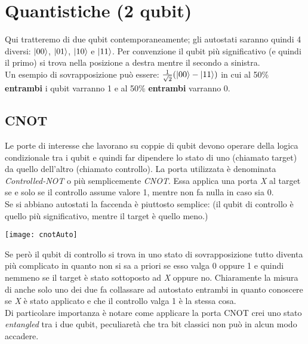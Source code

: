 \section{Quantistiche (2 qubit)}
Qui tratteremo di due qubit contemporaneamente; gli autostati saranno quindi 4 diversi: $\ket{00}$, $\ket{01}$, $\ket{10}$ e $\ket{11}$. Per convenzione il qubit più significativo (e quindi il primo) si trova nella posizione a destra mentre il secondo a sinistra.\\
Un esempio di sovrapposizione può essere: $\frac{1}{\sqrt{2}}(\ket{00} -\ket{11})$ in cui al 50\% \textbf{entrambi} i qubit varranno 1 e al 50\% \textbf{entrambi} varranno 0. 
\subsection{CNOT}
Le porte di interesse che lavorano su coppie di qubit devono operare della logica condizionale tra i qubit e quindi far dipendere lo stato di uno (chiamato target) da quello dell'altro (chiamato controllo). La porta utilizzata è denominata \textit{Controlled-NOT} o più semplicemente \textit{CNOT}. Essa applica una porta \textit{X} al target se e solo se il controllo assume valore 1, mentre non fa nulla in caso sia 0.\\
Se si abbiano autostati la faccenda è piuttosto semplice: (il qubit di controllo è quello più significativo, mentre il target è quello meno.)
\begin{center}
\texttt{[image: cnotAuto]}
\end{center}
Se però il qubit di controllo si trova in uno stato di sovrapposizione tutto diventa più complicato in quanto non si sa a priori se esso valga 0 oppure 1 e quindi nemmeno se il target è stato sottoposto ad \textit{X} oppure no. Chiaramente la misura di anche solo uno dei due fa collassare ad autostato entrambi in quanto conoscere se \textit{X} è stato applicato e che il controllo valga 1 è la stessa cosa.\\
Di particolare importanza è notare come applicare la porta CNOT crei uno stato \textit{entangled} tra i due qubit, peculiaretà che tra bit classici non può in alcun modo accadere.